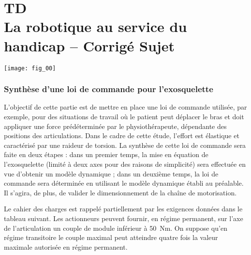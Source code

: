 \chapter*{TD  \\ 
La robotique au service du handicap -- 
\ifprof Corrigé \else Sujet \fi}

\iflivret {} \else
\ifprof  {} \else \fi
\fi

\setcounter{question}{0}

\begin{marginfigure} [4cm]
\centering
\texttt{[image: fig\_00]}
\end{marginfigure}

\subsection*{Synthèse d’une loi de commande pour l’exosquelette}

\begin{obj}
L’objectif de cette partie est de mettre en place une loi de commande utilisée, par exemple, pour des
situations de travail où le patient peut déplacer le bras et doit appliquer une force prédéterminée par le
physiothérapeute, dépendante des positions des articulations. Dans le cadre de cette étude, l’effort est
élastique et caractérisé par une raideur de torsion. La synthèse de cette loi de commande sera faite en
deux étapes : dans un premier temps, la mise en équation de l’exosquelette (limité à deux axes pour des
raisons de simplicité) sera effectuée en vue d’obtenir un modèle dynamique ; dans un deuxième temps,
la loi de commande sera déterminée en utilisant le modèle dynamique établi au préalable. Il s’agira, de
plus, de valider le dimensionnement de la chaîne de motorisation.
\end{obj}

Le cahier des charges est rappelé partiellement par les exigences données dans le tableau suivant. Les actionneurs peuvent fournir, en régime permanent, sur l’axe de l’articulation un
couple de module inférieur à \SI{50}{Nm}. On suppose qu’en régime transitoire le couple maximal peut atteindre quatre fois la valeur maximale autorisée en régime permanent.

